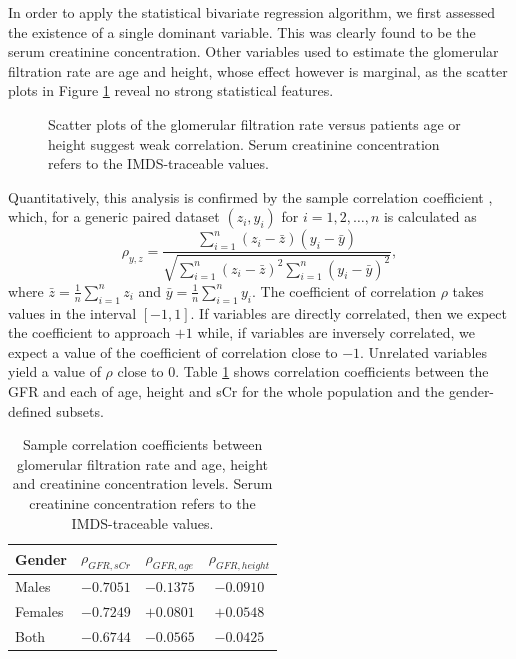 \documentclass[10pt,final]{siamltex}
\begin{document}
In order to apply the statistical bivariate regression algorithm, we first assessed the existence of a single dominant variable. This was clearly found to be the serum creatinine concentration. Other variables used to estimate the glomerular filtration rate are age and height, whose effect however is marginal, as the scatter plots in Figure \ref{recessive} reveal no strong statistical features.
%
\begin{figure}[ht]
  \centering
  \caption{Scatter plots of the glomerular filtration rate versus patients age or height suggest weak correlation. Serum creatinine concentration refers to the IMDS-traceable values.}
  \label{recessive}
\end{figure}
%
Quantitatively, this analysis is confirmed by the sample correlation coefficient \cite{mukaka}, which, for a generic paired dataset $(z_i, y_i)$ for $i = 1, 2, \ldots, n$ is calculated as
%
\begin{equation}
  \rho_{y,z} = \frac{\sum_{i = 1}^n{(z_i-\bar{z})(y_i-\bar{y})}}
  {\sqrt{\sum_{i=1}^n{(z_i-\bar{z})^2}\sum_{i=1}^n{(y_i-\bar{y})^2}}},
\end{equation}
%
where $\bar{z}=\tfrac{1}{n}\sum_{i=1}^nz_i$ and $\bar{y}=\tfrac{1}{n}\sum_{i=1}^ny_i$. The coefficient of correlation $\rho$ takes values in the interval $[-1,1]$. If variables are directly correlated, then we expect the coefficient to approach $+1$ while, if variables are inversely correlated, we expect a value of the coefficient of correlation close to $-1$. Unrelated variables yield a value of $\rho$ close to $0$. Table \ref{corr} shows correlation coefficients between the GFR and each of age, height and sCr for the whole population and the gender-defined subsets.
%
\begin{table}[ht]
  \centering
  \begin{tabular}{|l|c|c|c|}
    \hline
    \textbf{Gender}&$\rho_{\mathit{GFR},sCr}$&$\rho_{\mathit{GFR},age}$&$\rho_{\mathit{GFR},height}$\\
    \hline
    \textrm{Males}     & $-0.7051$ & $-0.1375$ & $-0.0910$  \\
    \hline
    \textrm{Females}   & $-0.7249$ &  $+0.0801$ &  $+0.0548$  \\
    \hline
    \textrm{Both}      & $-0.6744$ & $-0.0565$ & $-0.0425$  \\
    \hline
  \end{tabular}
  \caption{Sample correlation coefficients between glomerular filtration rate and age, height and creatinine concentration levels. Serum creatinine concentration refers to the IMDS-traceable values.}
  \label{corr}
\end{table}
\end{document}
